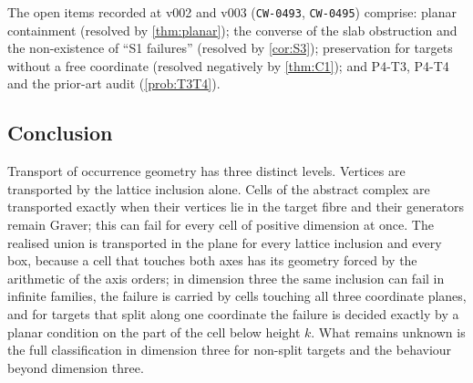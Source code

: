 The open items recorded at v002 and v003 (\texttt{CW-0493}, \texttt{CW-0495}) comprise: planar containment (resolved by \cref{thm:planar}); the converse of the slab obstruction and the non-existence of ``S1 failures'' (resolved by \cref{cor:S3}); preservation for targets without a free coordinate (resolved negatively by \cref{thm:C1}); and P4-T3, P4-T4 and the prior-art audit (\cref{prob:T3T4}).
\subsection{Conclusion}
Transport of occurrence geometry has three distinct levels. Vertices are transported by the lattice inclusion alone. Cells of the abstract complex are transported exactly when their vertices lie in the target fibre and their generators remain Graver; this can fail for every cell of positive dimension at once. The realised union is transported in the plane for every lattice inclusion and every box, because a cell that touches both axes has its geometry forced by the arithmetic of the axis orders; in dimension three the same inclusion can fail in infinite families, the failure is carried by cells touching all three coordinate planes, and for targets that split along one coordinate the failure is decided exactly by a planar condition on the part of the cell below height $k$. What remains unknown is the full classification in dimension three for non-split targets and the behaviour beyond dimension three.
